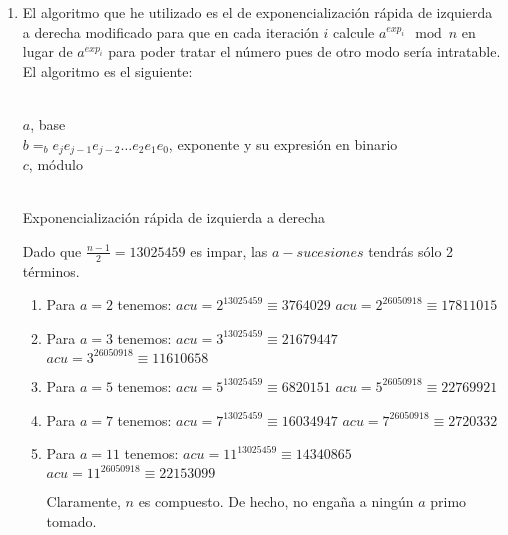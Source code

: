 	\begin{enumerate}
		\item El algoritmo que he utilizado es el de exponencialización rápida de izquierda a derecha modificado
		para que en cada iteración $i$ calcule $a^{exp_i} \mod{n}$ en lugar de $a^{exp_i}$ para poder tratar el
		número pues de otro modo sería intratable. El algoritmo es el siguiente:
		\begin{algorithm}[H]
			\begin{algorithmic}[1]
				\REQUIRE \ \\
					\texttt{$a$}, base \\
					\texttt{$b =_b e_je_{j-1}e_{j-2}\dots e_2e_1e_0$}, exponente y su expresión en binario \\
					\texttt{$c$}, módulo\\ \
					\ENDIF
				\ENDWHILE
			\end{algorithmic}
			\caption{Exponencialización rápida de izquierda a derecha}
			\label{Fast-exp}
		\end{algorithm}
		
		Dado que $\displaystyle \frac{n-1}{2} = 13025459$ es impar, las $a-sucesiones$ tendrás sólo 2 términos.
		
		\begin{enumerate}
			\item Para $a = 2$ tenemos:
				$acu = 2^{13025459} \equiv 3764029$
				$acu = 2^{26050918} \equiv 17811015$
				
			\item Para $a = 3$ tenemos:
				$acu = 3^{13025459} \equiv 21679447$
				$acu = 3^{26050918} \equiv 11610658$
				
			\item Para $a = 5$ tenemos:
				$acu = 5^{13025459} \equiv 6820151$
				$acu = 5^{26050918} \equiv 22769921$
				
			\item Para $a = 7$ tenemos:
				$acu = 7^{13025459} \equiv 16034947$
				$acu = 7^{26050918} \equiv 2720332$
				
			\item Para $a = 11$ tenemos:
				$acu = 11^{13025459} \equiv 14340865$
				$acu = 11^{26050918} \equiv 22153099$
				
			Claramente, $n$ es compuesto. De hecho, no engaña a ningún $a$ primo tomado.
		\end{enumerate}
		
	\end{enumerate}